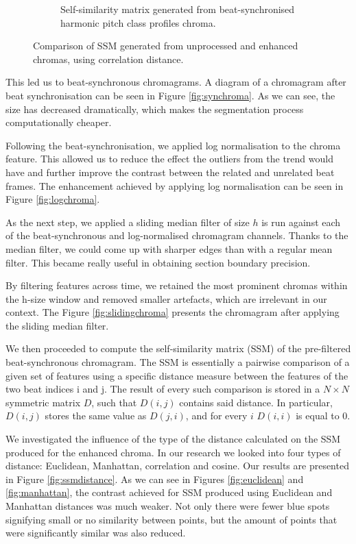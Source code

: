 \begin{figure}[b]
\begin{subfigure}[b]{0.47\textwidth}
                \caption{Self-similarity matrix generated from beat-synchronised harmonic pitch class profiles chroma.}
                \label{fig:synSSM}
        \end{subfigure}
          \caption{Comparison of SSM generated from unprocessed and enhanced chromas, using correlation distance.}
        \label{fig:ssmcomparison}
\end{figure}

This led us to beat-synchronous chromagrams. A diagram of a chromagram after beat synchronisation can be seen in Figure \ref{fig:synchroma}. As we can see, the size has decreased dramatically, which makes the segmentation process computationally cheaper.

Following the beat-synchronisation, we applied log normalisation to the chroma feature. This allowed us to reduce the effect the outliers from the trend would have and further improve the contrast between the related and unrelated beat frames. The enhancement achieved by applying log normalisation can be seen in Figure \ref{fig:logchroma}.

As the next step, we applied a sliding median filter of size $h$ is run against each of the beat-synchronous and log-normalised chromagram channels. Thanks to the median filter, we could come up with sharper edges than with a regular mean filter. This became really useful in obtaining section boundary precision.

By filtering features across time, we retained the most prominent chromas within the h-size window and removed smaller artefacts, which are irrelevant in our context. The Figure \ref{fig:slidingchroma} presents the chromagram after applying the sliding median filter.

We then proceeded to compute the self-similarity matrix (SSM) of the pre-filtered beat-synchronous chromagram. The SSM is essentially a pairwise comparison of a given set of features using a specific distance measure between the features of the two beat indices i and j. The result of every such comparison is stored in a $N \times N$ symmetric matrix $D$, such that $D(i, j)$ contains said distance. In particular, $D(i, j)$ stores the same value as $D(j, i)$, and for every $i$ $D(i, i)$ is equal to 0.

We investigated the influence of the type of the distance calculated on the SSM produced for the enhanced chroma. In our research we looked into four types of distance: Euclidean, Manhattan, correlation and cosine. Our results are presented in Figure \ref{fig:ssmdistance}. 
As we can see in Figures \ref{fig:euclidean} and \ref{fig:manhattan}, the contrast achieved for SSM produced using Euclidean and Manhattan distances was much weaker. Not only there were fewer blue spots signifying small or no similarity between points, but the amount of points that were significantly similar was also reduced.


